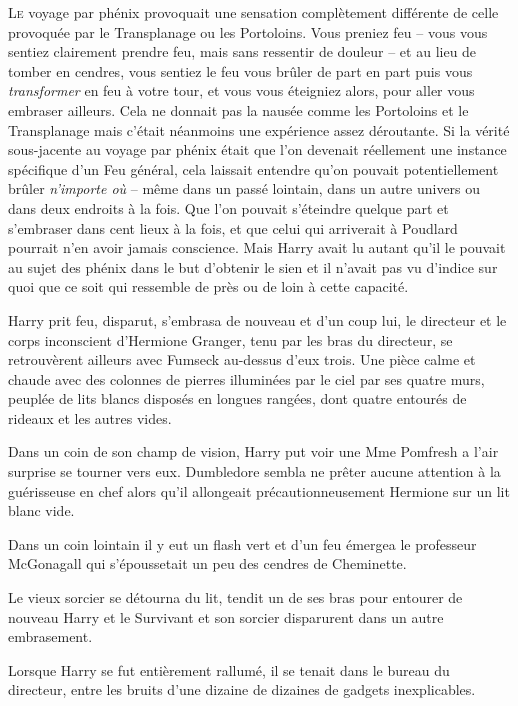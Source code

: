 
\lettrine{L}{e} voyage par phénix provoquait une sensation complètement différente de celle provoquée par le Transplanage ou les Portoloins. Vous preniez feu -- vous vous sentiez clairement prendre feu, mais sans ressentir de douleur -- et au lieu de tomber en cendres, vous sentiez le feu vous brûler de part en part puis vous \emph{transformer} en feu à votre tour, et vous vous éteigniez alors, pour aller vous embraser ailleurs. Cela ne donnait pas la nausée comme les Portoloins et le Transplanage mais c'était néanmoins une expérience assez déroutante. Si la vérité sous-jacente au voyage par phénix était que l'on devenait réellement une instance spécifique d'un Feu général, cela laissait entendre qu'on pouvait potentiellement brûler \emph{n'importe où} -- même dans un passé lointain, dans un autre univers ou dans deux endroits à la fois. Que l'on pouvait s'éteindre quelque part et s'embraser dans cent lieux à la fois, et que celui qui arriverait à Poudlard pourrait n'en avoir jamais conscience. Mais Harry avait lu autant qu'il le pouvait au sujet des phénix dans le but d'obtenir le sien et il n'avait pas vu d'indice sur quoi que ce soit qui ressemble de près ou de loin à cette capacité.

Harry prit feu, disparut, s'embrasa de nouveau et d'un coup lui, le directeur et le corps inconscient d'Hermione Granger, tenu par les bras du directeur, se retrouvèrent ailleurs avec Fumseck au-dessus d'eux trois. Une pièce calme et chaude avec des colonnes de pierres illuminées par le ciel par ses quatre murs, peuplée de lits blancs disposés en longues rangées, dont quatre entourés de rideaux et les autres vides.

Dans un coin de son champ de vision, Harry put voir une Mme Pomfresh a l'air surprise se tourner vers eux. Dumbledore sembla ne prêter aucune attention à la guérisseuse en chef alors qu'il allongeait précautionneusement Hermione sur un lit blanc vide.

Dans un coin lointain il y eut un flash vert et d'un feu émergea le professeur McGonagall qui s'époussetait un peu des cendres de Cheminette.

Le vieux sorcier se détourna du lit, tendit un de ses bras pour entourer de nouveau Harry et le Survivant et son sorcier disparurent dans un autre embrasement.

\later

Lorsque Harry se fut entièrement rallumé, il se tenait dans le bureau du directeur, entre les bruits d'une dizaine de dizaines de gadgets inexplicables.

